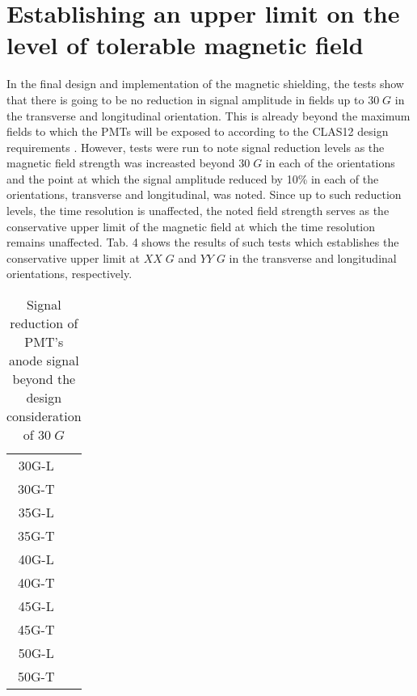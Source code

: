 \section{Establishing an upper limit on the level of tolerable magnetic field} In the final design and implementation of the magnetic shielding, the tests show that there is going to be no reduction in signal amplitude in fields up to $30\;G$ in the transverse and longitudinal orientation. This is already beyond the maximum fields to which the PMTs will be exposed to according to the CLAS12 design requirements \cite{CLAS12FTOFstudies}. However, tests were run to note signal reduction levels as the magnetic field strength was increasted beyond $30\;G$ in each of the orientations and the point at which the signal amplitude reduced by 10\% in each of the orientations, transverse and longitudinal, was noted. Since up to such reduction levels, the time resolution is unaffected, the noted field strength serves as the conservative upper limit of the magnetic field at which the time resolution remains unaffected. Tab. 4 shows the results of such tests which establishes the conservative upper limit at $XX\;G$ and $YY\;G$ in the transverse and longitudinal orientations, respectively.

\begin{table}[H]
	\begin{center}
		\begin{tabular}{|c|c|}
			\hline
			30G-L &  \\
 			30G-T &  \\ 
 			\hline
 			35G-L &  \\
 			35G-T &  \\
 			\hline
 			40G-L &  \\
 			40G-T &  \\
 			\hline
 			45G-L & \\
 			45G-T &  \\
 			\hline
 			50G-L &  \\
 			50G-T &  \\
 			\hline
 		\end{tabular}
	\end{center}
	\caption{Signal reduction of PMT's anode signal beyond the design consideration of $30\;G$}
\end{table}
